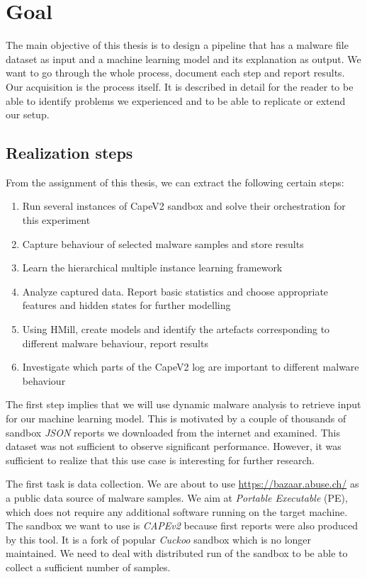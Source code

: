 \section{Goal}
The main objective of this thesis is to design a pipeline that has a malware file dataset as input and a machine learning model and its explanation as output. We want to go through the whole process, document each step and report results. Our acquisition is the process itself. It is described in detail for the reader to be able to identify problems we experienced and to be able to replicate or extend our setup.

\subsection{Realization steps}
From the assignment of this thesis, we can extract the following certain steps:
\begin{enumerate}
    \item Run several instances of CapeV2 \cite{Cape} sandbox and solve their orchestration for this experiment
    \item Capture behaviour of selected malware samples and store results
    \item Learn the hierarchical multiple instance learning framework
    \item Analyze captured data. Report basic statistics and choose appropriate features and hidden states for further modelling
    \item Using HMill, create models and identify the artefacts corresponding to different malware behaviour, report results
    \item Investigate which parts of the CapeV2 log are important to different malware behaviour
\end{enumerate}

The first step implies that we will use dynamic malware analysis to retrieve input for our machine learning model. This is motivated by a couple of thousands of sandbox \emph{JSON} reports we downloaded from the internet and examined. This dataset was not sufficient to observe significant performance. However, it was sufficient to realize that this use case is interesting for further research.

The first task is data collection. We are about to use \url{https://bazaar.abuse.ch/} as a public data source of malware samples. We aim at \emph{Portable Executable} (PE), which does not require any additional software running on the target machine. The sandbox we want to use is \emph{CAPEv2} \cite{Cape} because first reports were also produced by this tool.  It is a fork of popular \emph{Cuckoo} sandbox which is no longer maintained. We need to deal with distributed run of the sandbox to be able to collect a sufficient number of samples.

